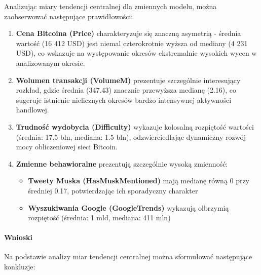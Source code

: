 \documentclass[
  11pt,
]{article}
\providecommand{\tightlist}{%
  \setlength{\itemsep}{0pt}\setlength{\parskip}{0pt}}
\begin{document}
Analizując miary tendencji centralnej dla zmiennych modelu, można
zaobserwować następujące prawidłowości:

\begin{enumerate}
\def\labelenumi{\arabic{enumi}.}
\item
  \textbf{Cena Bitcoina (Price)} charakteryzuje się znaczną asymetrią -
  średnia wartość (16 412 USD) jest niemal czterokrotnie wyższa od
  mediany (4 231 USD), co wskazuje na występowanie okresów ekstremalnie
  wysokich wycen w analizowanym okresie.
\item
  \textbf{Wolumen transakcji (VolumeM)} prezentuje szczególnie
  interesujący rozkład, gdzie średnia (347.43) znacznie przewyższa
  medianę (2.16), co sugeruje istnienie nielicznych okresów bardzo
  intensywnej aktywności handlowej.
\item
  \textbf{Trudność wydobycia (Difficulty)} wykazuje kolosalną rozpiętość
  wartości (średnia: 17.5 bln, mediana: 1.5 bln), odzwierciedlając
  dynamiczny rozwój mocy obliczeniowej sieci Bitcoin.
\item
  \textbf{Zmienne behawioralne} prezentują szczególnie wysoką zmienność:

  \begin{itemize}
  \tightlist
  \item
    \textbf{Tweety Muska (HasMuskMentioned)} mają medianę równą 0 przy
    średniej 0.17, potwierdzając ich sporadyczny charakter
  \item
    \textbf{Wyszukiwania Google (GoogleTrends)} wykazują olbrzymią
    rozpiętość (średnia: 1 mld, mediana: 411 mln)
  \end{itemize}
\end{enumerate}

\paragraph{\texorpdfstring{Wnioski \newline}{Wnioski }}\label{wnioski}

Na podstawie analizy miar tendencji centralnej można sformułować
następujące konkluzje:
\end{document}
